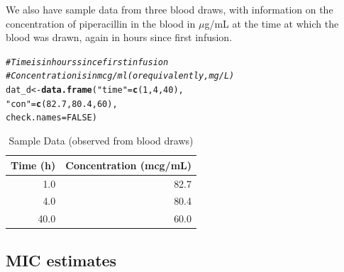 \documentclass{article}\usepackage[]{graphicx}\usepackage[]{color}
\makeatletter
\newcommand{\hlnum}[1]{\textcolor[rgb]{0.686,0.059,0.569}{#1}}%
\newcommand{\hlstr}[1]{\textcolor[rgb]{0.192,0.494,0.8}{#1}}%
\newcommand{\hlcom}[1]{\textcolor[rgb]{0.678,0.584,0.686}{\textit{#1}}}%
\newcommand{\hlstd}[1]{\textcolor[rgb]{0.345,0.345,0.345}{#1}}%
\newcommand{\hlkwb}[1]{\textcolor[rgb]{0.69,0.353,0.396}{#1}}%
\newcommand{\hlkwc}[1]{\textcolor[rgb]{0.333,0.667,0.333}{#1}}%
\newcommand{\hlkwd}[1]{\textcolor[rgb]{0.737,0.353,0.396}{\textbf{#1}}}%
\newenvironment{kframe}{%
 \def\at@end@of@kframe{}%
 \ifinner\ifhmode%
  \def\at@end@of@kframe{\end{minipage}}%
  \begin{minipage}{\columnwidth}%
 \fi\fi%
 \def\FrameCommand##1{\hskip\@totalleftmargin \hskip-\fboxsep
 \colorbox{shadecolor}{##1}\hskip-\fboxsep
     \hskip-\linewidth \hskip-\@totalleftmargin \hskip\columnwidth}%
 \MakeFramed {\advance\hsize-\width
   \@totalleftmargin\z@ \linewidth\hsize
   \@setminipage}}%
 {\par\unskip\endMakeFramed%
 \at@end@of@kframe}
\newenvironment{knitrout}{}{} %
\makeatother
\begin{document}
We also have sample data from three blood draws, with information on the concentration of piperacillin in the blood in $\mu$g/mL at the time at which the blood was drawn, again in hours since first infusion.
\begin{knitrout}
\color{fgcolor}\begin{kframe}
\begin{alltt}
\hlcom{# Time is in hours since first infusion}
\hlcom{# Concentration is in mcg/ml (or equivalently, mg/L)}
\hlstd{dat_d} \hlkwb{<-} \hlkwd{data.frame}\hlstd{(}\hlstr{"time"} \hlstd{=} \hlkwd{c}\hlstd{(}\hlnum{1}\hlstd{,} \hlnum{4}\hlstd{,} \hlnum{40}\hlstd{),}
                    \hlstr{"con"} \hlstd{=} \hlkwd{c}\hlstd{(}\hlnum{82.7}\hlstd{,} \hlnum{80.4}\hlstd{,} \hlnum{60}\hlstd{),}
                    \hlkwc{check.names} \hlstd{=} \hlnum{FALSE}\hlstd{)}
\end{alltt}
\end{kframe}
\end{knitrout}

\begin{table}[ht]
\centering
\caption{Sample Data (observed from blood draws)} 
\begin{tabular}{rr}
  \hline
Time (h) & Concentration (mcg/mL) \\ 
  \hline
1.0 & 82.7 \\ 
  4.0 & 80.4 \\ 
  40.0 & 60.0 \\ 
   \hline
\end{tabular}
\end{table}



\subsection{MIC estimates}
\end{document}
